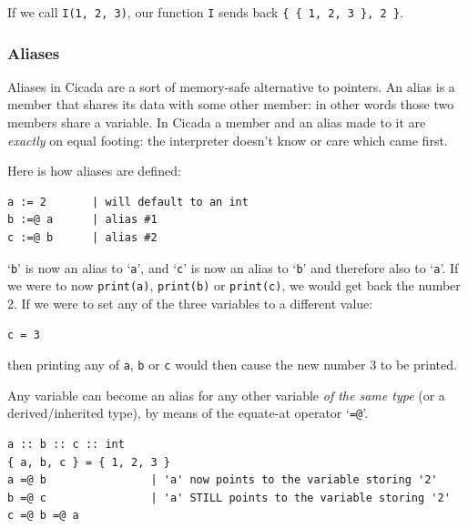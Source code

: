 \documentclass{article}
\newenvironment{code}{
       \begin{list}{}{
               \setlength{\leftmargin}{.4in}
               \setlength{\rightmargin}{0in}
               \setlength{\topsep}{.2in}
       }
       \small
       \item[] }
       { \end{list}   }
\begin{document}
\noindent If we call \verb#I(1, 2, 3)#, our function \verb#I# sends back \verb#{ { 1, 2, 3 }, 2 }#.




\subsubsection{Aliases} 

Aliases in Cicada are a sort of memory-safe alternative to pointers.  An alias is a member that shares its data with some other member:  in other words those two members share a variable.  In Cicada a member and an alias made to it are \emph{exactly} on equal footing:  the interpreter doesn't know or care which came first.

Here is how aliases are defined:

\begin{code} \begin{verbatim}
a := 2       | will default to an int
b :=@ a      | alias #1
c :=@ b      | alias #2
\end{verbatim} \end{code}

\noindent `\verb#b#' is now an alias to `\verb#a#', and `\verb#c#' is now an alias to `\verb#b#' and therefore also to `\verb#a#'.  If we were to now \texttt{print(a)}, \texttt{print(b)} or \texttt{print(c)}, we would get back the number 2.  If we were to set any of the three variables to a different value:

\begin{code} \begin{verbatim}
c = 3
\end{verbatim} \end{code}

\noindent then printing any of \texttt{a}, \texttt{b} or \texttt{c} would then cause the new number 3 to be printed.

Any variable can become an alias for any other variable \emph{of the same type} (or a derived/inherited type), by means of the equate-at operator `\texttt{=@}'.

\begin{code} \begin{verbatim}
a :: b :: c :: int
{ a, b, c } = { 1, 2, 3 }
a =@ b                | 'a' now points to the variable storing '2'
b =@ c                | 'a' STILL points to the variable storing '2'
c =@ b =@ a
\end{verbatim} \end{code}
\end{document}
